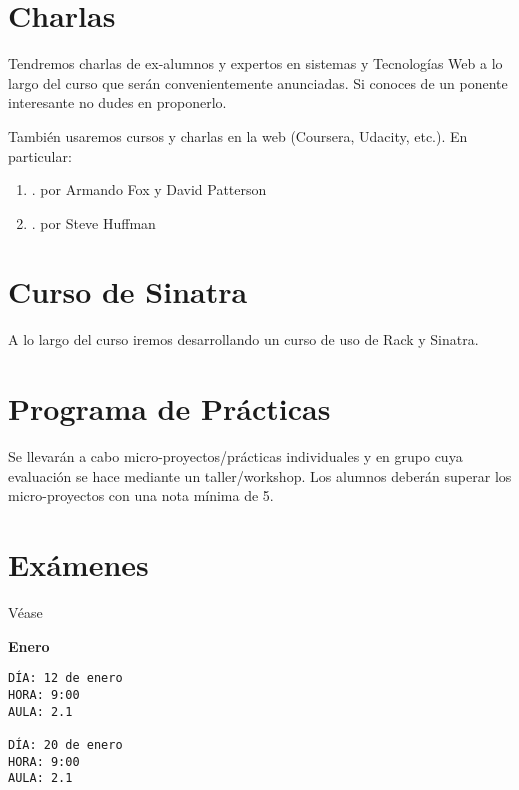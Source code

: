 \documentclass[11pt,a4paper]{article}
\begin{document}
\section{Charlas}
Tendremos charlas de ex-alumnos y expertos en sistemas y Tecnologías Web a lo largo del curso que serán convenientemente anunciadas.
Si conoces de un ponente interesante no dudes en proponerlo.


También usaremos cursos y charlas en la web (Coursera, Udacity, etc.). En particular:
\begin{enumerate}
\item {}.  por Armando Fox y David Patterson
\item {}.  por Steve Huffman
\end{enumerate}

\section{Curso de Sinatra}
A lo largo del curso iremos desarrollando un curso de uso de Rack y Sinatra.

\section{Programa de Pr\'acticas}

Se llevarán a cabo micro-proyectos/prácticas individuales y en grupo cuya evaluación se hace mediante un 
taller/workshop. Los alumnos deberán superar los micro-proyectos con una nota mínima de 5. 

\section{Exámenes}
Véase


{\bf Enero}
\begin{verbatim}
DÍA: 12 de enero
HORA: 9:00
AULA: 2.1

DÍA: 20 de enero
HORA: 9:00
AULA: 2.1
\end{verbatim}
\end{document}
